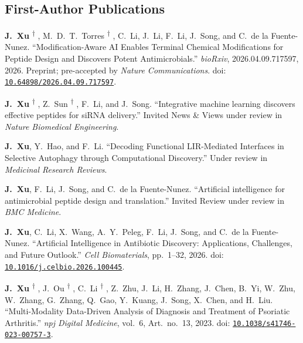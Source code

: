 \documentclass[10pt,a4paper]{article}
\newcommand{\equalcontrib}{%
  \textsuperscript{\ensuremath{\dagger}}%
}
\begin{document}
\subsection*{First-Author Publications}
\begin{enumerate}[label={[\arabic*]}, before={\interlinepenalty=10000}]

\item
\textbf{J.~Xu}\equalcontrib, M.~D.~T.~Torres\equalcontrib, C.~Li, J.~Li, F.~Li, J.~Song, and C.~de la Fuente-Nunez. ``Modification-Aware AI Enables Terminal Chemical Modifications for Peptide Design and Discovers Potent Antimicrobials.'' \textit{bioRxiv}, 2026.04.09.717597, 2026. Preprint; pre-accepted by \textit{Nature Communications}. doi: \href{https://doi.org/10.64898/2026.04.09.717597}{\nolinkurl{10.64898/2026.04.09.717597}}.

\item
\textbf{J.~Xu}\equalcontrib, Z.~Sun\equalcontrib, F.~Li, and J.~Song.
``Integrative machine learning discovers effective peptides for siRNA delivery.''
Invited News \& Views under review in \textit{Nature Biomedical Engineering}.


\item
\textbf{J.~Xu}, Y.~Hao, and F.~Li.
``Decoding Functional LIR-Mediated Interfaces in Selective Autophagy through Computational Discovery.''
Under review in \textit{Medicinal Research Reviews}.

\item
\textbf{J.\ Xu}, F.\ Li, J.\ Song, and C.\ de la Fuente-Nunez.
``Artificial intelligence for antimicrobial peptide design and translation.''
Invited Review under review in \textit{BMC Medicine}.


\item
\textbf{J.~Xu}, C.~Li, X.~Wang, A.~Y.~Peleg, F.~Li, J.~Song, and C.~de la Fuente-Nunez.
``Artificial Intelligence in Antibiotic Discovery: Applications, Challenges, and Future Outlook.''
\textit{Cell Biomaterials}, pp.~1--32, 2026.
doi: \href{https://doi.org/10.1016/j.celbio.2026.100445}{\nolinkurl{10.1016/j.celbio.2026.100445}}.

\item
\textbf{J.~Xu}\equalcontrib, J.~Ou\equalcontrib, C.~Li\equalcontrib, Z.~Zhu, J.~Li, H.~Zhang, J.~Chen, B.~Yi, W.~Zhu, W.~Zhang, G.~Zhang, Q.~Gao, Y.~Kuang, J.~Song, X.~Chen, and H.~Liu.
``Multi-Modality Data-Driven Analysis of Diagnosis and Treatment of Psoriatic Arthritis.''
\textit{npj Digital Medicine}, vol.~6, Art.~no.~13, 2023.
doi: \href{https://doi.org/10.1038/s41746-023-00757-3}{\nolinkurl{10.1038/s41746-023-00757-3}}.




\end{enumerate}
\end{document}
